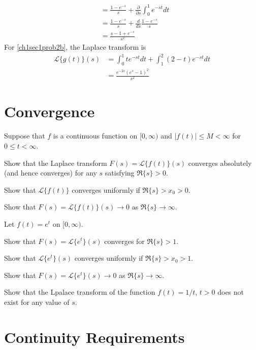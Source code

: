 \begin{exercise}
\begin{align*}
                           & = \frac{1 - e^{-s}}{s} +
                             \frac{\partial }{\partial s}\int_0^1e^{-st}dt\\
                           & = \frac{1 - e^{-s}}{s} + \frac{d}{ds}
                             \frac{1 - e^{-s}}{s}\\
                           & = \frac{s - 1 + e^{-s}}{s^2}
  \end{align*}
  For \cref{ch1sec1prob2b}, the Laplace transform is
  \begin{align*}
    \mathcal{L}\{g(t)\}(s) & = \int_0^1te^{-st}dt + \int_1^2(2 - t)e^{-st}dt\\
                           & = \frac{e^{-2s}(e^s - 1)^2}{s^2}
  \end{align*}
\end{exercise}

\section{Convergence}

\begin{exercise}
\item
  Suppose that \(f\) is a continuous function on \([0,\infty)\) and
  \(\lvert f(t)\rvert\leq M < \infty\) for \(0\leq t < \infty\).
  \begin{exercise}[label = (\alph*)]
  \item
    Show that the Laplace transform \(F(s) = \mathcal{L}\{f(t)\}(s)\) converges
    absolutely (and hence converges) for any \(s\) satisfying \(\Re\{s\} > 0\).
  \item
    Show that \(\mathcal{L}\{f(t)\}\) converges uniformly if
    \(\Re\{s\} > x_0 > 0\).
  \item
    Show that \(F(s) = \mathcal{L}\{f(t)\}(s)\to 0\) as \(\Re\{s\}\to\infty\).
  \end{exercise}
\item
  Let \(f(t) = e^t\) on \([0,\infty)\).
  \begin{exercise}[label = (\alph*)]
  \item
    Show that \(F(s) = \mathcal{L}\{e^t\}(s)\) converges for \(\Re\{s\} > 1\).
  \item
    Show that \(\mathcal{L}\{e^t\}(s)\) converges uniformly if
    \(\Re\{s\} > x_0 > 1\).
  \item
    Show that \(F(s) = \mathcal{L}\{e^t\}(s)\to 0\) as \(\Re\{s\}\to\infty\).
  \end{exercise}
\item
  Show that the Lpalace transform of the function \(f(t) = 1/t\), \(t > 0\)
  does not exist for any value of \(s\).
\end{exercise}

\section{Continuity Requirements}

